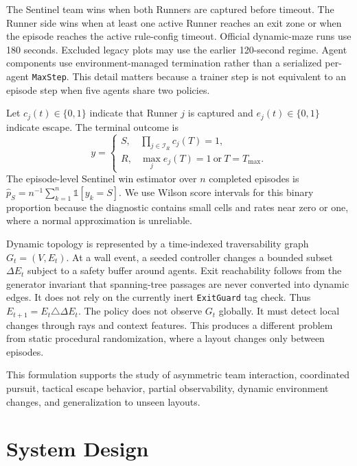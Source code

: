 \documentclass[journal]{IEEEtran}
\begin{document}
The Sentinel team wins when both Runners are captured before timeout. The Runner side wins when at least one active Runner reaches an exit zone or when the episode reaches the active rule-config timeout. Official dynamic-maze runs use 180 seconds. Excluded legacy plots may use the earlier 120-second regime. Agent components use environment-managed termination rather than a serialized per-agent \texttt{MaxStep}. This detail matters because a trainer step is not equivalent to an episode step when five agents share two policies.

Let $c_j(t)\in\{0,1\}$ indicate that Runner $j$ is captured and $e_j(t)\in\{0,1\}$ indicate escape. The terminal outcome is
\begin{equation}
y=
\begin{cases}
S, & \prod_{j\in\mathcal{I}_R} c_j(T)=1,\\
R, & \max_j e_j(T)=1\ \text{or}\ T=T_{\max}.
\end{cases}
\end{equation}
The episode-level Sentinel win estimator over $n$ completed episodes is $\hat{p}_S=n^{-1}\sum_{k=1}^{n}\mathbb{1}[y_k=S]$. We use Wilson score intervals for this binary proportion because the diagnostic contains small cells and rates near zero or one, where a normal approximation is unreliable.

Dynamic topology is represented by a time-indexed traversability graph $G_t=(V,E_t)$. At a wall event, a seeded controller changes a bounded subset $\Delta E_t$ subject to a safety buffer around agents. Exit reachability follows from the generator invariant that spanning-tree passages are never converted into dynamic edges. It does not rely on the currently inert \texttt{ExitGuard} tag check. Thus $E_{t+1}=E_t\triangle\Delta E_t$. The policy does not observe $G_t$ globally. It must detect local changes through rays and context features. This produces a different problem from static procedural randomization, where a layout changes only between episodes.

This formulation supports the study of asymmetric team interaction, coordinated pursuit, tactical escape behavior, partial observability, dynamic environment changes, and generalization to unseen layouts.

\section{System Design}
\end{document}
